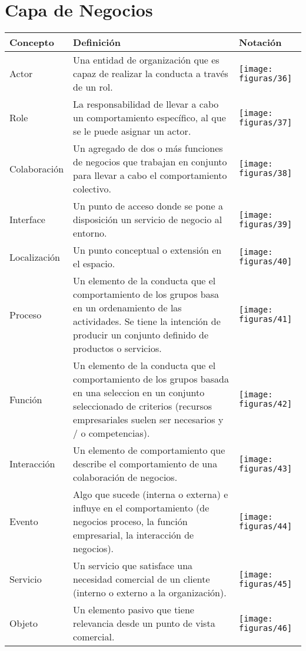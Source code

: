 \section{Capa de Negocios}
  \begin{longtable}
	{|m{3cm}|m{4.8cm}|m{4.8cm}|}
	\toprule
	Concepto & Definición & Notación \\
	\midrule
	 Actor & Una entidad de organización que es capaz de realizar la conducta a través de un rol. & \texttt{[image: figuras/36]} \\ \hline
	 Role & La responsabilidad de llevar a cabo un comportamiento específico, al que se le puede asignar un actor. & \texttt{[image: figuras/37]} \\ \hline
	 Colaboración & Un agregado de dos o más funciones de negocios que trabajan en conjunto para llevar a cabo el comportamiento colectivo. & \texttt{[image: figuras/38]} \\ \hline
	 Interface & Un punto de acceso donde se pone a disposición un servicio de negocio al entorno. & \texttt{[image: figuras/39]} \\ \hline
	 Localización & Un punto conceptual o extensión en el espacio. & \texttt{[image: figuras/40]} \\ \hline
	 Proceso & Un elemento de la conducta que el comportamiento de los grupos basa en un ordenamiento de las actividades. Se tiene la intención de producir un conjunto definido de productos o servicios. & \texttt{[image: figuras/41]} \\ \hline
	 Función & Un elemento de la conducta que el comportamiento de los grupos basada en una seleccion en un conjunto seleccionado de criterios (recursos empresariales suelen ser necesarios y / o competencias). & \texttt{[image: figuras/42]} \\ \hline
	 Interacción & Un elemento de comportamiento que describe el comportamiento de una colaboración de negocios. & \texttt{[image: figuras/43]} \\ \hline
	 Evento & Algo que sucede (interna o externa) e influye en el comportamiento (de negocios
	 proceso, la función empresarial, la interacción de negocios). & \texttt{[image: figuras/44]} \\ \hline
	 Servicio & Un servicio que satisface una necesidad comercial de un cliente (interno o externo a la organización). & \texttt{[image: figuras/45]} \\ \hline
	 Objeto & Un elemento pasivo que tiene relevancia desde un punto de vista comercial. & \texttt{[image: figuras/46]} \\ \hline

\end{longtable}
